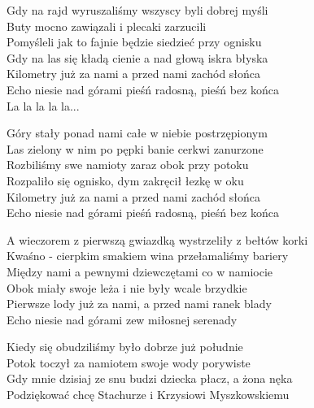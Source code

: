 \begin{text}
    \small{
Gdy na rajd wyruszaliśmy wszyscy byli dobrej myśli\\
Buty mocno zawiązali i plecaki zarzucili\\
Pomyśleli jak to fajnie będzie siedzieć przy ognisku\\
Gdy na las się kładą cienie a nad głową iskra błyska\\
Kilometry już za nami a przed nami zachód słońca\\
Echo niesie nad górami pieśń radosną, pieśń bez końca\\
La la la la la...

Góry stały ponad nami całe w niebie postrzępionym\\
Las zielony w nim po pępki banie cerkwi zanurzone\\
Rozbiliśmy swe namioty zaraz obok przy potoku\\
Rozpaliło się ognisko, dym zakręcił łezkę w oku\\
Kilometry już za nami a przed nami zachód słońca\\
Echo niesie nad górami pieśń radosną, pieśń bez końca

A wieczorem z pierwszą gwiazdką wystrzeliły z bełtów korki\\
Kwaśno - cierpkim smakiem wina przełamaliśmy bariery\\
Między nami a pewnymi dziewczętami co w namiocie\\
Obok miały swoje leża i nie były wcale brzydkie\\
Pierwsze lody już za nami, a przed nami ranek blady\\
Echo niesie nad górami zew miłosnej serenady

Kiedy się obudziliśmy było dobrze już południe\\
Potok toczył za namiotem swoje wody porywiste\\
Gdy mnie dzisiaj ze snu budzi dziecka płacz, a żona nęka\\
Podziękować chcę Stachurze i Krzysiowi Myszkowskiemu
    }
\end{text}
